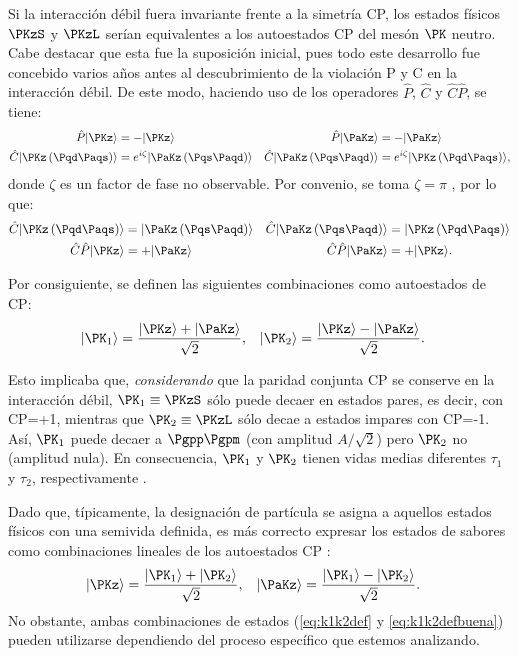 Si la interacción débil fuera invariante frente a la simetría CP, los estados físicos $\PKzS$ y $\PKzL$ serían equivalentes a los autoestados CP del mesón $\PK$ neutro. Cabe destacar que esta fue la suposición inicial, pues todo este desarrollo fue concebido varios años antes al descubrimiento de la violación P y C en la interacción débil. De este modo, haciendo uso de los operadores $\hat{P}$, $\hat{C}$ y $\hat{C}\hat{P}$, se tiene:
\begin{align}
\hat{P}|\PKz\rangle &= -|\PKz\rangle & \hat{P}|\PaKz\rangle &= -|\PaKz\rangle\\
\hat{C}|\PKz\left(\Pqd\Paqs\right)\rangle &= e^{i\zeta}|\PaKz\left(\Pqs\Paqd\right)\rangle & \hat{C}|\PaKz\left(\Pqs\Paqd\right)\rangle &= e^{i\zeta}|\PKz\left(\Pqd\Paqs\right)\rangle ,
\end{align}
donde $\zeta$ es un factor de fase no observable. Por convenio, se toma $\zeta=\pi$ \cite{Thomson}, por lo que:
\begin{align}
\hat{C}|\PKz\left(\Pqd\Paqs\right)\rangle &=|\PaKz\left(\Pqs\Paqd\right)\rangle & \hat{C}|\PaKz\left(\Pqs\Paqd\right)\rangle &= |\PKz\left(\Pqd\Paqs\right)\rangle\\
\hat{C}\hat{P}|\PKz\rangle &= +|\PaKz\rangle & \hat{C}\hat{P}|\PaKz\rangle &= +|\PKz\rangle .
\end{align}

Por consiguiente, se definen las siguientes combinaciones como autoestados de CP:
\begin{align}
|\PK_{1}\rangle &= \dfrac{|\PKz\rangle + |\PaKz\rangle}{\sqrt{2}}, & |\PK_{2}\rangle &= \dfrac{|\PKz\rangle - |\PaKz\rangle}{\sqrt{2}}.\label{eq:k1k2def}
\end{align}

Esto implicaba que, \textit{considerando} que la paridad conjunta CP se conserve en la interacción débil, $\PK_{1} \equiv \PKzS$ sólo puede decaer en estados pares, es decir, con CP=+1, mientras que $\PK_{2} \equiv \PKzL$ sólo decae a estados impares con CP=-1. Así, $\PK_{1}$ puede decaer a $\Pgpp \Pgpm$ (con amplitud $A/ \sqrt{2}$) pero $\PK_{2}$ no (amplitud nula). En consecuencia, $\PK_{1}$ y $\PK_{2}$ tienen vidas medias diferentes $\tau_{1}$ y $\tau_{2}$, respectivamente \cite{Pais, Perkins}.

Dado que, típicamente, la designación de partícula se asigna a aquellos estados físicos con una semivida definida, es más correcto expresar los estados de sabores como combinaciones lineales de los autoestados CP \cite{Pais}:
\begin{align}
|\PKz\rangle &= \dfrac{|\PK_{1}\rangle + |\PK_{2}\rangle}{\sqrt{2}}, & |\PaKz\rangle &= \dfrac{|\PK_{1}\rangle - |\PK_{2}\rangle}{\sqrt{2}}.\label{eq:k1k2defbuena}
\end{align}
No obstante, ambas combinaciones de estados (\ref{eq:k1k2def} y \ref{eq:k1k2defbuena}) pueden utilizarse dependiendo del proceso específico que estemos analizando.

